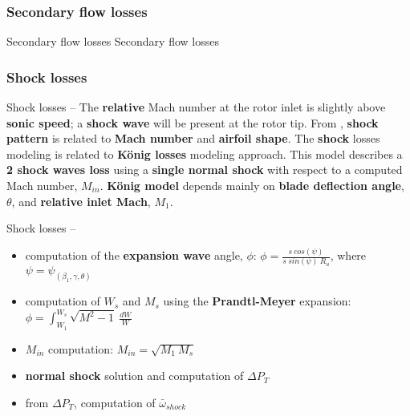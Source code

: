 \subsubsection{Secondary flow losses}
	\begin{frame}{Secondary flow losses}
		Secondary flow losses
	\end{frame}
\subsubsection{Shock losses}
	\begin{frame}{Shock losses -- }
		The \textbf{relative} Mach number at the rotor inlet is slightly above \textbf{sonic speed}; a \textbf{shock wave} will be present at the rotor tip. From \cite{manfredi2020transonic}, \textbf{shock pattern} is related to \textbf{Mach number} and \textbf{airfoil shape}.
		\newline
		\newline 
		The \textbf{shock} losses modeling is related to \textbf{K\"onig losses} modeling approach. This model describes a \textbf{2 shock waves loss} using a \textbf{single normal shock} with respect to a computed Mach number, $M_{in}$. 
		\newline
		\newline
		\textbf{K\"onig model} \cite[Sec. 6.7]{axial2004} depends mainly on \textbf{blade deflection angle}, $\theta$, and \textbf{relative inlet Mach}, $M_1$.
	\end{frame}
	\begin{frame}{Shock losses -- }
		\begin{itemize}
			\item computation of the \textbf{expansion wave} angle, $\phi$: $\phi = \frac{s \ cos(\psi)}{s \ sin(\psi) \ R_u}$, where $\psi = \psi_{(\beta_1, \gamma, \theta)}$
			\item computation of $W_s$ and $M_s$ using the \textbf{Prandtl-Meyer} expansion: $\phi = \int_{W_1}^{W_s} \sqrt{M^2 - 1} \ \frac{dW}{W}$
			\item $M_{in}$ computation: $M_{in} = \sqrt{M_1 \ M_s}$
			\item \textbf{normal shock} solution and computation of $\Delta P_T$
			\item from $\Delta P_T$, computation of $\bar{\omega}_{shock}$
		\end{itemize}
	\end{frame}
